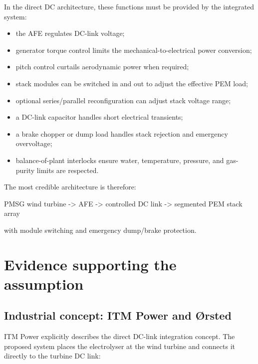 \documentclass[
  letterpaper,
  DIV=11,
  numbers=noendperiod]{scrartcl}
\newenvironment{Shaded}{\begin{snugshade}}{\end{snugshade}}
\newcommand{\NormalTok}[1]{\textcolor[rgb]{0.00,0.23,0.31}{#1}}
\providecommand{\tightlist}{%
  \setlength{\itemsep}{0pt}\setlength{\parskip}{0pt}}
\begin{document}
In the direct DC architecture, these functions must be provided by the
integrated system:

\begin{itemize}
\tightlist
\item
  the AFE regulates DC-link voltage;
\item
  generator torque control limits the mechanical-to-electrical power
  conversion;
\item
  pitch control curtails aerodynamic power when required;
\item
  stack modules can be switched in and out to adjust the effective PEM
  load;
\item
  optional series/parallel reconfiguration can adjust stack voltage
  range;
\item
  a DC-link capacitor handles short electrical transients;
\item
  a brake chopper or dump load handles stack rejection and emergency
  overvoltage;
\item
  balance-of-plant interlocks ensure water, temperature, pressure, and
  gas-purity limits are respected.
\end{itemize}

The most credible architecture is therefore:

\begin{Shaded}
\begin{Highlighting}[]
\NormalTok{PMSG wind turbine {-}\textgreater{} AFE {-}\textgreater{} controlled DC link {-}\textgreater{} segmented PEM stack array}
\end{Highlighting}
\end{Shaded}

with module switching and emergency dump/brake protection.

\section{Evidence supporting the
assumption}\label{evidence-supporting-the-assumption}

\subsection{Industrial concept: ITM Power and
Ørsted}\label{industrial-concept-itm-power-and-uxf8rsted}

ITM Power explicitly describes the direct DC-link integration concept.
The proposed system places the electrolyser at the wind turbine and
connects it directly to the turbine DC link:
\end{document}
